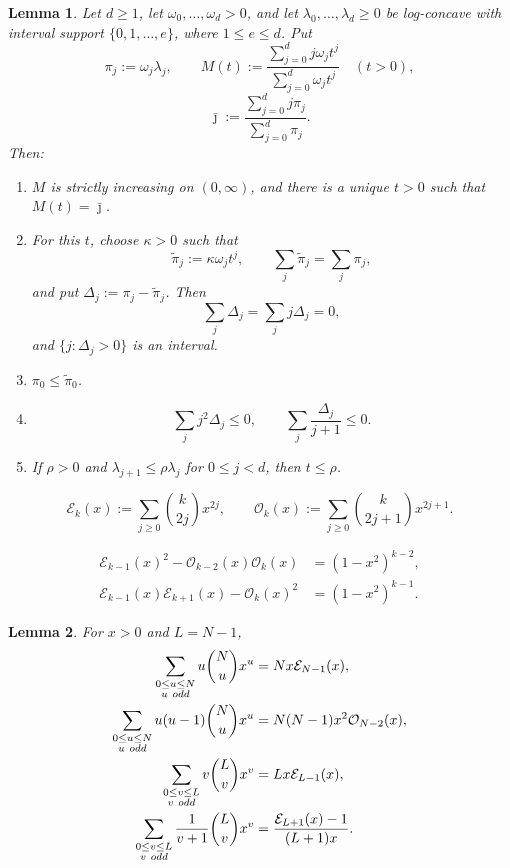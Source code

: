 \documentclass[10pt,a4paper]{amsart}
\newtheorem{lemma}{Lemma}
\begin{document}
\begin{lemma}\label{lem:crossing}
Let \(d\ge1\), let \(\omega_0,\ldots,\omega_d>0\), and let
\(\lambda_0,\ldots,\lambda_d\ge0\) be log-concave with interval support
\(\{0,1,\ldots,e\}\), where \(1\le e\le d\).  Put
\[
 \pi_j:=\omega_j\lambda_j,
 \qquad
 M(t):=
 \frac{\sum_{j=0}^d j\omega_jt^j}
      {\sum_{j=0}^d\omega_jt^j}
 \quad(t>0),
\]
\[
 \bar\jmath:=
 \frac{\sum_{j=0}^d j\pi_j}
      {\sum_{j=0}^d\pi_j}.
\]
Then:
\begin{enumerate}[label=\textup{(\alph*)}]
\item \(M\) is strictly increasing on \((0,\infty)\), and there is a
      unique \(t>0\) such that \(M(t)=\bar\jmath\).
\item For this \(t\), choose \(\kappa>0\) such that
      \[
       \widetilde\pi_j:=\kappa\omega_jt^j,
       \qquad
       \sum_j\widetilde\pi_j=\sum_j\pi_j,
      \]
      and put \(\Delta_j:=\pi_j-\widetilde\pi_j\).  Then
      \[
       \sum_j\Delta_j=\sum_jj\Delta_j=0,
      \]
      and \(\{j:\Delta_j>0\}\) is an interval.
\item \(\pi_0\le\widetilde\pi_0\).
\item
      \[
       \sum_jj^2\Delta_j\le0,
       \qquad
       \sum_j\frac{\Delta_j}{j+1}\le0.
      \]
\item If \(\rho>0\) and
      \(\lambda_{j+1}\le\rho\lambda_j\) for \(0\le j<d\), then
      \(t\le\rho\).
\end{enumerate}
\end{lemma}

\begin{equation}\label{eq:parity-polynomials}
 \mathcal E_k(x):=\sum_{j\ge0}\binom{k}{2j}x^{2j},
 \qquad
 \mathcal O_k(x):=\sum_{j\ge0}\binom{k}{2j+1}x^{2j+1}.
\end{equation}

\begin{align}
 \mathcal E_{k-1}(x)^2
 -\mathcal O_{k-2}(x)\mathcal O_k(x)
 &=(1-x^2)^{k-2},\label{eq:parity-first}\\
 \mathcal E_{k-1}(x)\mathcal E_{k+1}(x)
 -\mathcal O_k(x)^2
 &=(1-x^2)^{k-1}.\label{eq:parity-second}
\end{align}

\begin{lemma}\label{lem:reference-sums}
For \(x>0\) and \(L=N-1\),
\begin{align*}
 \sum_{\substack{0\le u\le N\\u\ {\rm odd}}}
 u\binom Nu x^u
 &=Nx\mathcal E_{N-1}(x),\\
 \sum_{\substack{0\le u\le N\\u\ {\rm odd}}}
 u(u-1)\binom Nu x^u
 &=N(N-1)x^2\mathcal O_{N-2}(x),\\
 \sum_{\substack{0\le v\le L\\v\ {\rm odd}}}
 v\binom Lv x^v
 &=Lx\mathcal E_{L-1}(x),\\
 \sum_{\substack{0\le v\le L\\v\ {\rm odd}}}
 \frac1{v+1}\binom Lv x^v
 &=\frac{\mathcal E_{L+1}(x)-1}{(L+1)x}.
\end{align*}
\end{lemma}
\end{document}
